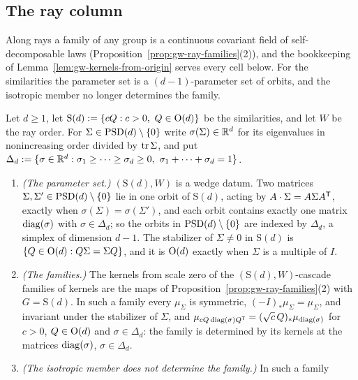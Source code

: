 \subsection{The ray column}

Along rays a family of any group is a continuous covariant field of self-decomposable laws
(Proposition~\ref{prop:gw-ray-families}(2)), and the bookkeeping of Lemma~\ref{lem:gw-kernels-from-origin}
serves every cell below. For the similarities the parameter set is a $(d-1)$-parameter set of orbits,
and the isotropic member no longer determines the family.

\begin{proposition}\label{prop:similarity-ray-families}
Let $d \ge 1$, let $\mathrm S(d) := \{cQ : c > 0,\ Q \in \mathrm{O}(d)\}$ be the similarities, and let $W$ be
the ray order. For $\Sigma \in \mathrm{PSD}(d) \setminus \{0\}$ write $\sigma(\Sigma) \in \mathbb{R}^d$ for its
eigenvalues in nonincreasing order divided by $\operatorname{tr}\Sigma$, and put
$\Delta_d := \{\sigma \in \mathbb{R}^d : \sigma_1 \ge \dots \ge \sigma_d \ge 0,\ \sigma_1 + \dots + \sigma_d = 1\}$.
\begin{enumerate}
\item \emph{(The parameter set.)} $(\mathrm S(d), W)$ is a wedge datum. Two matrices
$\Sigma, \Sigma' \in \mathrm{PSD}(d) \setminus \{0\}$ lie in one orbit of $\mathrm S(d)$, acting by
$A\cdot\Sigma = A\Sigma A^{\mathsf{T}}$, exactly when $\sigma(\Sigma) = \sigma(\Sigma')$, and each orbit contains
exactly one matrix $\operatorname{diag}(\sigma)$ with $\sigma \in \Delta_d$; so the orbits in $\mathrm{PSD}(d) \setminus \{0\}$
are indexed by $\Delta_d$, a simplex of dimension $d - 1$. The stabilizer of $\Sigma \ne 0$ in
$\mathrm S(d)$ is $\{Q \in \mathrm{O}(d) : Q\Sigma = \Sigma Q\}$, and it is $\mathrm{O}(d)$ exactly when $\Sigma$ is
a multiple of $I$.
\item \emph{(The families.)} The kernels from scale zero of the $(\mathrm S(d), W)$-cascade families of
kernels are the maps of Proposition~\ref{prop:gw-ray-families}(2) with $G = \mathrm S(d)$. In such a family every
$\mu_\Sigma$ is symmetric, $(-I)_*\mu_\Sigma = \mu_\Sigma$, and invariant under the stabilizer of
$\Sigma$, and $\mu_{cQ\operatorname{diag}(\sigma)Q^{\mathsf{T}}} = (\sqrt c\,Q)_*\mu_{\operatorname{diag}(\sigma)}$ for $c > 0$, $Q \in \mathrm{O}(d)$
and $\sigma \in \Delta_d$: the family is determined by its kernels at the matrices $\operatorname{diag}(\sigma)$,
$\sigma \in \Delta_d$.
\item \emph{(The isotropic member does not determine the family.)} In such a family

\end{enumerate}
\end{proposition}
